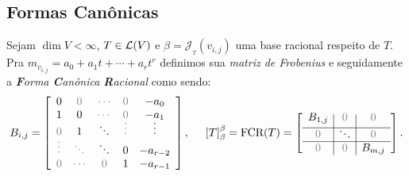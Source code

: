 \subsection{Formas Canônicas}

\begin{definition}
    Sejam \(\dim V < \infty\), \(T \in \mathcal{L} ( V)\) e \(\beta = \mathscr{J}_{_T}(v_{i,j})\) uma base racional respeito de \(T\). Pra \(m_{v_{i,j}} =  a_0  + a_1 t + \cdots + a_r{t}^r\) definimos sua \emph{matriz de Frobenius} e seguidamente a \emph{\textbf{F}orma \textbf{C}anônica \textbf{R}acional}  como sendo:   
    \[B_{i,j} = \left[\begin{array}{c c c c c}
        0 & \textcolor{gray}{0} & \textcolor{gray}{\cdots} & \textcolor{gray}{0} & -a_0 \\ 
        1 & 0 &  \textcolor{gray}{\rotatebox{0}{$\cdots$}} & \textcolor{gray}{0}  & -a_1 \\ 
        \textcolor{gray}{0} & 1  & \rotatebox{135}{$\ldots$}  & \textcolor{gray}{\rotatebox{90}{$\ldots$}} & \rotatebox{90}{$\ldots$} \\ 
        \textcolor{gray}{\rotatebox{90}{$\cdots$}} & \textcolor{gray}{\rotatebox{135}{$\ldots$}}  & \rotatebox{135}{$\ldots$} & 0 & -a_{r-2} \\   
        \textcolor{gray}{0} & \textcolor{gray}{\cdots}  & \textcolor{gray}{0} & 1 & -a_{r-1}  
    \end{array}\right], \hspace{0.5cm} [T]_\beta^\beta= \text{FCR}(T) = \left[\begin{array}{c |  c |  c}
        B_{1,j} & \textcolor{gray}{0}& \textcolor{gray}{0}\vspace{0.1cm}\\ \hline 
        \textcolor{gray}{0} & \rotatebox{145}{$ \ldots$} & \textcolor{gray}{0}\\ \hline
        \textcolor{gray}{0} & \textcolor{gray}{0} & B_{m,j}\\ 
    \end{array}\right].\]
\end{definition}

